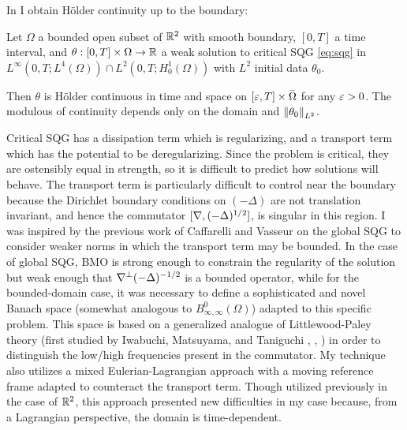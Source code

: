 In \cite{StVa.sqg} I obtain H\"{o}lder continuity up to the boundary:
\begin{theorem}
Let $\Omega$ a bounded open subset of $\mathbb{R}^2$ with smooth boundary, $[0,T]$ a time interval, and $\theta:[0,T] \times \Omega \to \mathbb{R}$ a weak solution to critical SQG \eqref{eq:sqg} in $L^\infty(0,T; L^4(\Omega)) \cap L^2(0,T; H_0^1(\Omega))$ with $L^2$ initial data $\theta_0$.  

Then $\theta$ is H\"{o}lder continuous in time and space on $[\varepsilon,T]\times \bar{\Omega}$ for any $\varepsilon > 0$.  The modulous of continuity depends only on the domain and $\left\lVert\theta_0\right\rVert_{L^2}$.  
\end{theorem}
Critical SQG has a dissipation term which is regularizing, and a transport term which has the potential to be deregularizing.  Since the problem is critical, they are ostensibly equal in strength, so it is difficult to predict how solutions will behave.  The transport term is particularly difficult to control near the boundary because the Dirichlet boundary conditions on $(-\Delta)$ are not translation invariant, and hence the commutator $[\nabla, (-\Delta)^{1/2}]$, is singular in this region.  %
I was inspired by the previous work of Caffarelli and Vasseur \cite{CaVa} on the global SQG to consider weaker norms in which the transport term may be bounded.  In the case of global SQG, BMO is strong enough to constrain the regularity of the solution but weak enough that $\nabla^\perp(-\Delta)^{-1/2}$ is a bounded operator, 
while for the bounded-domain case, it was necessary to define a sophisticated and novel Banach space (somewhat analogous to $B_{\infty,\infty}^0(\Omega)$) adapted to this specific problem.  This space is based on a generalized analogue of Littlewood-Paley theory (first studied by Iwabuchi, Matsuyama, and Taniguchi \cite{IMT.besov}, \cite{IMT.bilinear}, \cite{IMT.schrodinger}) in order to distinguish the low/high frequencies present in the commutator.  
My technique also utilizes a mixed Eulerian-Lagrangian approach with a moving reference frame adapted to counteract the transport term.  Though utilized previously in the case of $\mathbb{R}^2$, this approach presented new difficulties in my case because, from a Lagrangian perspective, the domain is time-dependent.  

